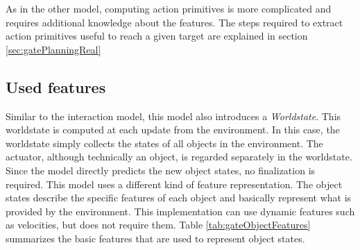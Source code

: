 As in the other model, computing action primitives is more complicated and requires additional knowledge about the features. The steps required to extract action primitives useful to reach a given target are explained in section \ref{sec:gatePlanningReal}


%
%
%


\subsection{Used features \label{sec:gateFeatures}}

Similar to the interaction model, this model also introduces a \textit{Worldstate}. This worldstate is computed at each update from the environment. In this case, the worldstate simply collects the states of all objects in the environment. The actuator, although technically an object, is regarded separately in the worldstate. Since the model directly predicts the new object states, no finalization is required. 
This model uses a different kind of feature representation. The object states describe the specific features of each object and basically represent what is provided by the environment. This implementation can use dynamic features such as velocities, but does not require them. Table \ref{tab:gateObjectFeatures} summarizes the basic features that are used to represent object states.

